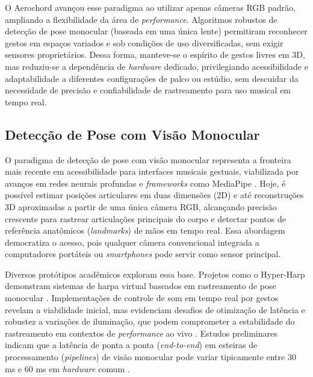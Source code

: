 O Aerochord avançou esse paradigma ao utilizar apenas câmeras RGB padrão, ampliando a flexibilidade da área de \textit{performance}. Algoritmos robustos de detecção de pose monocular (baseada em uma única lente) permitiram reconhecer gestos em espaços variados e sob condições de uso diversificadas, sem exigir sensores proprietários. Dessa forma, manteve-se o espírito de gestos livres em 3D, mas reduziu-se a dependência de \textit{hardware} dedicado, privilegiando acessibilidade e adaptabilidade a diferentes configurações de palco ou estúdio, sem descuidar da necessidade de precisão e confiabilidade de rastreamento para uso musical em tempo real.

\subsection{Detecção de Pose com Visão Monocular}
\label{subsec:deteccao_pose_visao_monocular}

O paradigma de detecção de pose com visão monocular representa a fronteira mais recente em acessibilidade para interfaces musicais gestuais, viabilizada por avanços em redes neurais profundas e \textit{frameworks} como MediaPipe \cite{lugaresi2019mediapipe}. Hoje, é possível estimar posições articulares em duas dimensões (2D) e até reconstruções 3D aproximadas a partir de uma única câmera RGB, alcançando precisão crescente para rastrear articulações principais do corpo e detectar pontos de referência anatômicos (\textit{landmarks}) de mãos em tempo real. Essa abordagem democratiza o acesso, pois qualquer câmera convencional integrada a computadores portáteis ou \textit{smartphones} pode servir como sensor principal.

Diversos protótipos acadêmicos exploram essa base. Projetos como o Hyper-Harp demonstram sistemas de harpa virtual baseados em rastreamento de pose monocular \cite{americo2020hyperharp}. Implementações de controle de som em tempo real por gestos revelam a viabilidade inicial, mas evidenciam desafios de otimização de latência e robustez a variações de iluminação, que podem comprometer a estabilidade do rastreamento em contextos de \textit{performance} ao vivo \cite{hassan2019gestureaudio}. Estudos preliminares indicam que a latência de ponta a ponta (\textit{end-to-end}) em esteiras de processamento (\textit{pipelines}) de visão monocular pode variar tipicamente entre 30 ms e 60 ms em \textit{hardware} comum \cite{lugaresi2019mediapipe, hassan2019gestureaudio}. 

